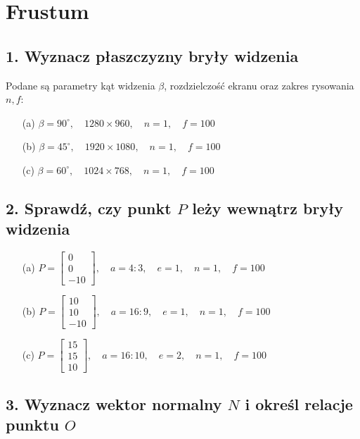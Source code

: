 \section{Frustum}

\subsection*{1. Wyznacz płaszczyzny bryły widzenia}

Podane są parametry kąt widzenia \( \beta \), rozdzielczość ekranu oraz zakres rysowania \( n, f \):

\begin{enumerate}
    \item[(a)] \( \beta = 90^\circ, \quad 1280 \times 960, \quad n = 1, \quad f = 100 \)
    \item[(b)] \( \beta = 45^\circ, \quad 1920 \times 1080, \quad n = 1, \quad f = 100 \)
    \item[(c)] \( \beta = 60^\circ, \quad 1024 \times 768, \quad n = 1, \quad f = 100 \)
\end{enumerate}

\subsection*{2. Sprawdź, czy punkt \( P \) leży wewnątrz bryły widzenia}

\begin{enumerate}
    \item[(a)] \( P = \begin{bmatrix} 0 \\ 0 \\ -10 \end{bmatrix}, \quad a = 4:3, \quad e = 1, \quad n = 1, \quad f = 100 \)
    \item[(b)] \( P = \begin{bmatrix} 10 \\ 10 \\ -10 \end{bmatrix}, \quad a = 16:9, \quad e = 1, \quad n = 1, \quad f = 100 \)
    \item[(c)] \( P = \begin{bmatrix} 15 \\ 15 \\ 10 \end{bmatrix}, \quad a = 16:10, \quad e = 2, \quad n = 1, \quad f = 100 \)
\end{enumerate}

\subsection*{3. Wyznacz wektor normalny \( N \) i określ relacje punktu \( O \)}

